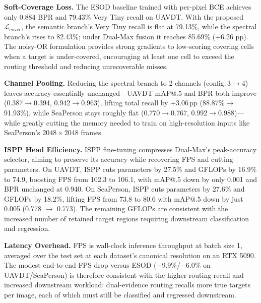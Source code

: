 \textbf{Soft-Coverage Loss.} The ESOD baseline trained with per-pixel BCE achieves only 0.884 BPR and 79.43\% Very Tiny recall on UAVDT. With the proposed $\mathcal{L}_{\mathrm{cover}}$, the semantic branch's Very Tiny recall is flat at 79.13\%, while the spectral branch's rises to 82.43\%; under Dual-Max fusion it reaches 85.69\% (+6.26 pp). The noisy-OR formulation provides strong gradients to low-scoring covering cells when a target is under-covered, encouraging at least one cell to exceed the routing threshold and reducing unrecoverable misses.

\textbf{Channel Pooling.} Reducing the spectral branch to 2 channels (config.\,3$\to$4) leaves accuracy essentially unchanged---UAVDT mAP@.5 and BPR both improve (0.387$\to$0.394, 0.942$\to$0.963), lifting total recall by +3.06\,pp (88.87\%$\to$91.93\%), while SeaPerson stays roughly flat (0.770$\to$0.767, 0.992$\to$0.988)---while greatly cutting the memory needed to train on high-resolution inputs like SeaPerson's $2048\times 2048$ frames.

\textbf{ISPP Head Efficiency.} ISPP fine-tuning compresses Dual-Max's peak-accuracy selector, aiming to preserve its accuracy while recovering FPS and cutting parameters. On UAVDT, ISPP cuts parameters by 27.5\% and GFLOPs by 16.9\% to 74.9, boosting FPS from 102.3 to 106.1, with mAP@.5 down by only 0.001 and BPR unchanged at 0.940. On SeaPerson, ISPP cuts parameters by 27.6\% and GFLOPs by 18.2\%, lifting FPS from 73.8 to 80.6 with mAP@.5 down by just 0.005 (0.778 $\to$ 0.773). The remaining GFLOPs are consistent with the increased number of retained target regions requiring downstream classification and regression.

\textbf{Latency Overhead.} FPS is wall-clock inference throughput at batch size 1, averaged over the test set at each dataset's canonical resolution on an RTX 5090. The modest end-to-end FPS drop versus ESOD ($-$9.9\%/$-$6.0\% on UAVDT/SeaPerson) is therefore consistent with the higher routing recall and increased downstream workload: dual-evidence routing recalls more true targets per image, each of which must still be classified and regressed downstream.
